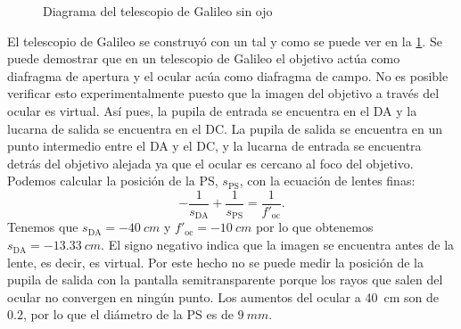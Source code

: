 \documentclass[12pt]{article}
\numberwithin{table}{section}
\numberwithin{figure}{section}
\numberwithin{equation}{section}
\begin{document}
\begin{figure}[htb]

	\caption{Diagrama del telescopio de Galileo sin ojo}
	\label{fig:telescopio galileo}
\end{figure}
El telescopio de Galileo se construyó con un  tal y como se puede ver en la \cref{fig:telescopio galileo}. Se puede demostrar que en un telescopio de Galileo el objetivo actúa como diafragma de apertura y el ocular acúa como diafragma de campo. No es posible verificar esto experimentalmente puesto que la imagen del objetivo a través del ocular es virtual. Así pues, la pupila de entrada se encuentra en el DA y la lucarna de salida se encuentra en el DC. La pupila de salida se encuentra en un punto intermedio entre el DA y el DC, y la lucarna de entrada se encuentra detrás del objetivo alejada ya que el ocular es cercano  al foco del objetivo. Podemos calcular la posición de la PS, \( s_\text{PS} \), con la ecuación de lentes finas:
\begin{equation} \label{eqn:PS galileo}
	-\frac{1}{s_\text{DA}} + \frac{1}{s_\text{PS}} = \frac{1}{f'_\text{oc}}.
\end{equation}
Tenemos que \( s_\text{DA} = \SI{-40}{cm} \) y \( f'_\text{oc} = \SI{-10}{cm} \) por lo que obtenemos \( s_\text{DA} = \SI{-13.33}{cm} \). El signo negativo indica que la imagen se encuentra antes de la lente, es decir, es virtual. Por este hecho no se puede medir la posición de la pupila de salida con la pantalla semitransparente porque los rayos que salen del ocular no convergen en ningún punto. Los aumentos del ocular a \SI{40}{cm} son de \num{0.2}, por lo que el diámetro de la PS es de \( \SI{9}{mm} \).
\end{document}
